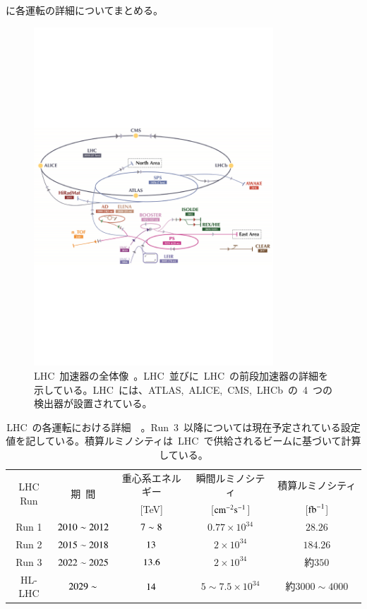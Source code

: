 に各運転の詳細についてまとめる。
\begin{figure}[H]
        \centering   
        \includegraphics[width=0.8\textwidth]{img/jpeg/lhclhc.pdf}
        \caption[LHC 加速器の全体像]{LHC~加速器の全体像~\cite{URL:01}。LHC~並びに~LHC~の前段加速器の詳細を示している。LHC~には、ATLAS,~ALICE,~CMS,~LHCb~の~4~つの検出器が設置されている。}\label{fig:lhc}
\end{figure}

\begin{table}[tb]
	\centering
	\begin{tabular}{c|cccc}\hline
	    \multirow{2}{*}{LHC Run} & \multirow{2}{*}{期~間} & 重心系エネルギー & 瞬間ルミノシティ & 積算ルミノシティ　\\ 
	     &  & [TeV] & [$\rm{cm}^{-2}\rm{s}^{-1}$] & [$\rm{fb}^{-1}$]　\\ \hline\hline
		Run 1 & $\rm{2010\sim\rm2012}$ & $\rm{7\sim8}$ & $0.77\times10^{34}$ & $28.26$ \\ \hline
		Run 2 & $\rm{2015\sim2018}$ & $\rm{13}$ & $2\times10^{34}$ & $184.26$ \\ \hline
		Run 3 & $\rm{2022\sim2025}$ & $\rm{13.6}$ & $2\times10^{34}$ & 約$350$ \\\hline
		HL-LHC & $\rm{2029\sim}$ & $\rm{14}$ & $5\sim7.5\times10^{34}$ & 約$3000\sim4000$ \\ \hline
	\end{tabular}
	\caption[LHC の各運転における詳細]{LHC~の各運転における詳細~\cite{URL:18}~\cite{URL:17}。Run~3~以降については現在予定されている設定値を記している。積算ルミノシティは~LHC~で供給されるビームに基づいて計算している。}
    \label{tb:LHC}
\end{table}

